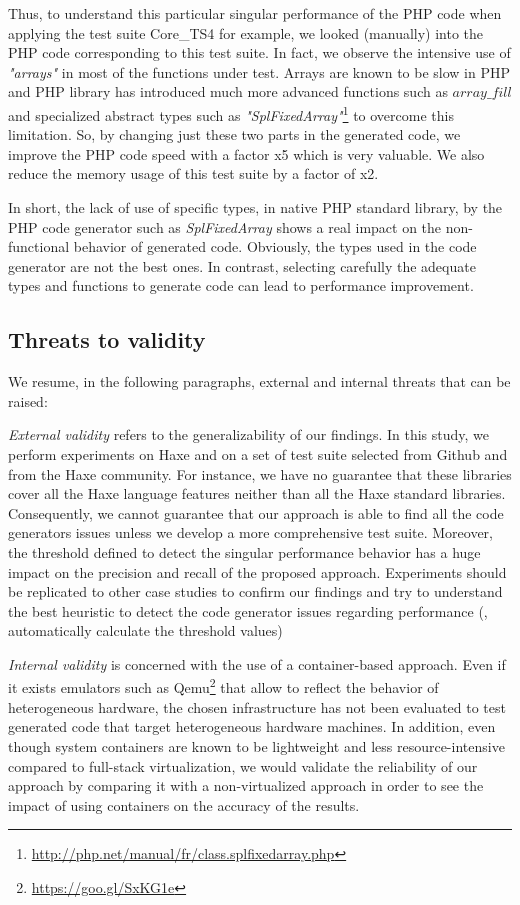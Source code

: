 Thus, to understand this particular singular performance of the PHP code when applying the test suite Core\_TS4 for example, we looked (manually) into the PHP code corresponding to this test suite. In fact, we observe the intensive use of \textit{"arrays"} in most of the functions under test. Arrays are known to be slow in PHP and PHP library has introduced much more advanced functions such as $array\_fill$ and specialized abstract types such as \textit{"SplFixedArray"}\footnote{\url{http://php.net/manual/fr/class.splfixedarray.php}} to overcome this limitation. So, by changing just these two parts in the generated code, we improve the PHP code speed with a factor x5 which is very valuable. We also reduce the memory usage of this test suite by a factor of x2.

In short, the lack of use of specific types, in native PHP standard library, by the PHP code generator such as \textit{SplFixedArray} shows a real impact on the non-functional behavior of generated code. Obviously, the types used in the code generator are not the best ones. In contrast, selecting carefully the adequate types and functions to generate code can lead to performance improvement. 

\subsection{Threats to validity}
We resume, in the following paragraphs, external and internal threats that can be raised:

\textit{External validity} refers to the generalizability of our findings. In this study, we perform experiments on Haxe and on a set of test suite selected from Github and from the Haxe community. For instance, we have no guarantee that these libraries cover all the Haxe language features neither than all the Haxe standard libraries. Consequently, we cannot guarantee that our approach is able to find all the code generators issues unless we develop a more comprehensive test suite. Moreover, the threshold defined to detect the singular performance behavior has a huge impact on the precision and recall of the proposed approach. Experiments should be replicated to other case studies to confirm our findings and try to understand the best heuristic to detect the code generator issues regarding performance (\ie, automatically calculate the threshold values)

\textit{Internal validity} is concerned with the use of a container-based approach. Even if it exists emulators such as Qemu\footnote{\url{https://goo.gl/SxKG1e}} that allow to reflect the behavior of heterogeneous hardware, the chosen infrastructure has not been evaluated to test generated code that target heterogeneous hardware machines. In addition, even though system containers are known to be lightweight and less resource-intensive compared to full-stack virtualization, we would validate the reliability of our approach by comparing it with a non-virtualized approach in order to see the impact of using containers on the accuracy of the results.



